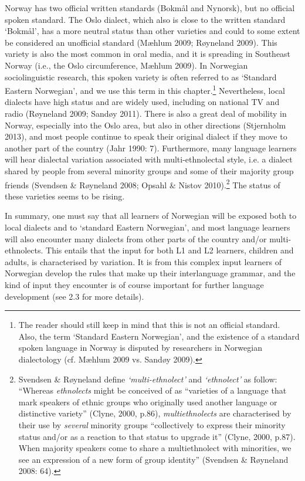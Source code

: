 \documentclass[12pt]{article}
\newenvironment{styleStandard}{\renewcommand\baselinestretch{1.0}\setlength\leftskip{0cm}\setlength\rightskip{0cm plus 1fil}\setlength\parindent{0cm}\setlength\parfillskip{0pt plus 1fil}\setlength\parskip{0in plus 1pt}\writerlistparindent\writerlistleftskip\leavevmode\normalfont\normalsize\writerlistlabel\ignorespaces}{\unskip\vspace{0in plus 1pt}\par}
\newcommand\writerlistleftskip{}
\newcommand\writerlistparindent{}
\newcommand\writerlistlabel{}
\begin{document}
\begin{styleStandard}
Norway has two official written standards (Bokmål and Nynorsk), but no official spoken standard. The Oslo dialect, which also is close to the written standard ‘Bokmål’, has a more neutral status than other varieties and could to some extent be considered an unofficial standard (Mæhlum 2009; Røyneland 2009). This variety is also the most common in oral media, and it is spreading in Southeast Norway (i.e., the Oslo circumference, Mæhlum 2009). In Norwegian sociolinguistic research, this spoken variety is often referred to as ‘Standard Eastern Norwegian’, and we use this term in this chapter.\footnote{\textrm{ The reader should still keep in mind that this is not an official standard. Also, the term ‘Standard Eastern Norwegian’, and the existence of a standard spoken language in Norway is disputed by researchers in Norwegian dialectology (cf. Mæhlum 2009 vs. Sandøy 2009). }} Nevertheless, local dialects have high status and are widely used, including on national TV and radio (Røyneland 2009; Sandøy 2011). There is also a great deal of mobility in Norway, especially into the Oslo area, but also in other directions (Stjernholm 2013), and most people continue to speak their original dialect if they move to another part of the country (Jahr 1990: 7). Furthermore, many language learners will hear dialectal variation associated with multi-ethnolectal style, i.e. a dialect shared by people from several minority groups and some of their majority group friends (Svendsen \& Røyneland 2008; Opsahl \& Nistov 2010).\footnote{\textrm{ Svendsen \& Røyneland define }\textrm{\textit{‘multi-ethnolect’}}\textrm{ and }\textrm{\textit{‘ethnolect’}}\textrm{ as follow: “Whereas }\textrm{\textit{ethnolects}}\textrm{ might be conceived of as “varieties of a language that mark speakers of ethnic groups who originally used another language or distinctive variety” (Clyne, 2000, p.86), }\textrm{\textit{multiethnolects}}\textrm{ are characterised by their use by }\textrm{\textit{several}}\textrm{ minority groups “collectively to express their minority status and/or as a reaction to that status to upgrade it” (Clyne, 2000, p.87). When majority speakers come to share a multiethnolect with minorities, we see an expression of a new form of group identity” (Svendsen \& Røyneland 2008: 64).}} The status of these varieties seems to be rising.
\end{styleStandard}

\begin{styleStandard}
In summary, one must say that all learners of Norwegian will be exposed both to local dialects and to ‘standard Eastern Norwegian’, and most language learners will also encounter many dialects from other parts of the country and/or multi-ethnolects. This entails that the input for both L1 and L2 learners, children and adults, is characterised by variation. It is from this complex input learners of Norwegian develop the rules that make up their interlanguage grammar, and the kind of input they encounter is of course important for further language development (see 2.3 for more details). 
\end{styleStandard}
\end{document}
